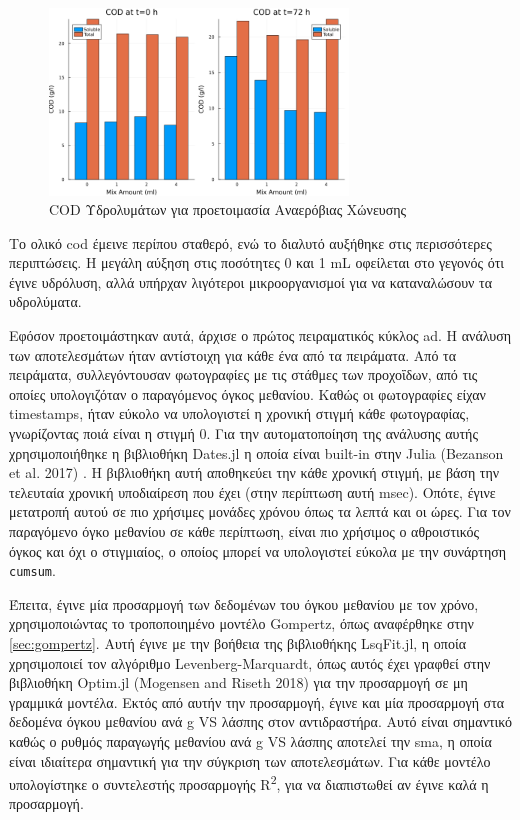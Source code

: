 \documentclass[11pt]{report}
\makeatletter
\newcommand{\citeprocitem}[2]{\hyper@linkstart{cite}{citeproc_bib_item_#1}#2\hyper@linkend}
\makeatother
\begin{document}
\begin{figure}[htbp]
\centering
\includegraphics[width=300px]{../plots/26_03/complete_cod_bar_26_03.png}
\caption{\label{fig:org0b48e26}COD Υδρολυμάτων για προετοιμασία Αναερόβιας Χώνευσης}
\end{figure}

Το ολικό \acrshort{cod} έμεινε περίπου σταθερό, ενώ το διαλυτό αυξήθηκε στις περισσότερες περιπτώσεις. Η μεγάλη αύξηση στις ποσότητες 0 και 1 mL οφείλεται στο γεγονός ότι έγινε υδρόλυση, αλλά υπήρχαν λιγότεροι μικροοργανισμοί για να καταναλώσουν τα υδρολύματα.

Εφόσον προετοιμάστηκαν αυτά, άρχισε ο πρώτος πειραματικός κύκλος \acrshort{ad}. Η ανάλυση των αποτελεσμάτων ήταν αντίστοιχη για κάθε ένα από τα πειράματα. Από τα πειράματα, συλλεγόντουσαν φωτογραφίες με τις στάθμες των προχοΐδων, από τις οποίες υπολογιζόταν ο παραγόμενος όγκος μεθανίου. Καθώς οι φωτογραφίες είχαν timestamps, ήταν εύκολο να υπολογιστεί η χρονική στιγμή κάθε φωτογραφίας, γνωρίζοντας ποιά είναι η στιγμή 0. Για την αυτοματοποίηση της ανάλυσης αυτής χρησιμοποιήθηκε η βιβλιοθήκη Dates.jl η οποία είναι built-in στην Julia (\citeprocitem{5}{Bezanson et al. 2017}) . Η βιβλιοθήκη αυτή αποθηκεύει την κάθε χρονική στιγμή, με βάση την τελευταία χρονική υποδιαίρεση που έχει (στην περίπτωση αυτή msec). Οπότε, έγινε μετατροπή αυτού σε πιο χρήσιμες μονάδες χρόνου όπως τα λεπτά και οι ώρες. Για τον παραγόμενο όγκο μεθανίου σε κάθε περίπτωση, είναι πιο χρήσιμος ο αθροιστικός όγκος και όχι ο στιγμιαίος, ο οποίος μπορεί να υπολογιστεί εύκολα με την συνάρτηση \texttt{cumsum}.

Έπειτα, έγινε μία προσαρμογή των δεδομένων του όγκου μεθανίου με τον χρόνο, χρησιμοποιώντας το τροποποιημένο μοντέλο Gompertz, όπως αναφέρθηκε στην \autoref{sec:gompertz}. Αυτή έγινε με την βοήθεια της βιβλιοθήκης LsqFit.jl, η οποία χρησιμοποιεί τον αλγόριθμο Levenberg-Marquardt, όπως αυτός έχει γραφθεί στην βιβλιοθήκη Optim.jl (\citeprocitem{44}{Mogensen and Riseth 2018}) για την προσαρμογή σε μη γραμμικά μοντέλα. Εκτός από αυτήν την προσαρμογή, έγινε και μία προσαρμογή στα δεδομένα όγκου μεθανίου ανά g VS λάσπης στον αντιδραστήρα. Αυτό είναι σημαντικό καθώς ο ρυθμός παραγωγής μεθανίου ανά g VS λάσπης αποτελεί την \acrfull{sma}, η οποία είναι ιδιαίτερα σημαντική για την σύγκριση των αποτελεσμάτων. Για κάθε μοντέλο υπολογίστηκε ο συντελεστής προσαρμογής R\textsuperscript{2}, για να διαπιστωθεί αν έγινε καλά η προσαρμογή.
\end{document}

